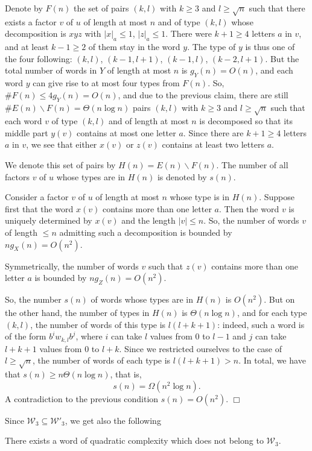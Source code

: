 \documentclass[runningheads,envcountsect,envcountsame]{llncs}
\begin{document}
Denote by $F(n)$ the set of pairs $(k,l)$ with $k \geq 3$ and $l \geq \sqrt{n}$ such that there exists a factor $v$ of $u$ of length at most $n$ and of type $(k,l)$ whose decomposition is $xyz$ with $|x|_a \leq 1$, $|z|_a \leq 1$. There were $k+1\geq 4$ letters $a$ in $v$, and at least $k-1 \geq 2$ of them stay in the word $y$. The type of $y$ is thus one of the four following: $(k,l)$,
$(k-1,l+1)$, $(k-1,l)$, $(k-2,l+1)$. But the total number of words in $Y$ of length at most $n$ is $g_Y(n)=O(n)$, and each word $y$ can give rise to at most four types from $F(n)$. So, $\# F(n)\leq 4g_Y(n)=O(n)$, and due to the previous claim, there are still $\# E(n) \backslash F(n)=\Theta(n \log n)$ pairs $(k,l)$ with $k \geq 3$ and $l \geq \sqrt{n}$ such that each word $v$ of type $(k,l)$ and of length at most $n$ is decomposed so that its middle part $y(v)$ contains at most one letter $a$. Since there are $k+1\geq 4$ letters $a$ in $v$, we see that either $x(v)$ or $z(v)$ contains at least two letters $a$.

We denote this set of pairs by $H(n)=E(n)\backslash F(n)$. The number of all factors $v$ of $u$ whose types are in $H(n)$ is denoted by $s(n)$.

Consider a factor $v$ of $u$ of length at most $n$ whose type is in $H(n)$. Suppose first that the word $x(v)$ contains more than one letter $a$. Then the word $v$ is uniquely determined by $x(v)$ and the length $|v|\leq n$. So, the number of words $v$ of length $\leq n$ admitting such a decomposition is bounded by $n g_X(n)=O(n^2)$.

Symmetrically, the number of words $v$ such that $z(v)$ contains more than one letter $a$ is bounded by $n g_Z(n)=O(n^2)$.

So, the number $s(n)$ of words whose types are in $H(n)$ is $O(n^2)$. But on the other hand, the number of types in $H(n)$ is $\Theta(n \log n)$, and for each type $(k,l)$, the number of words of this type is $l(l+k+1)$: indeed, such a word is of the form $b^iw_{k,l}b^j$, where $i$ can take $l$ values from 0 to $l-1$ and $j$ can take $l+k+1$ values from 0 to $l+k$. Since we restricted ourselves to the case of $l \geq \sqrt{n}$, the number of words of each type is $l(l+k+1)> n$. In total, we have that
$s(n) \geq n\Theta(n \log n)$, that is,
\[s(n)=\Omega(n^2 \log n).\]
A contradiction to the previous condition $s(n)=O(n^2)$. \hfill $\Box$

\medskip
Since $\mathcal W_3 \subseteq \mathcal W'_3$, we get also the following
\begin{corollary}
        There exists a word of quadratic complexity which does not belong to $\mathcal W_3$.
\end{corollary}
\end{document}
